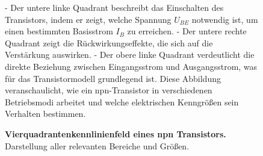{\begin{figure}[H]
{    - Der untere linke Quadrant beschreibt das Einschalten des Transistors, indem er zeigt, welche Spannung \( U_{BE} \) notwendig ist, um einen bestimmten Basisstrom \( I_B \) zu erreichen.  
    - Der untere rechte Quadrant zeigt die Rückwirkungseffekte, die sich auf die Verstärkung auswirken.  
    - Der obere linke Quadrant verdeutlicht die direkte Beziehung zwischen Eingangsstrom und Ausgangsstrom, was für das Transistormodell grundlegend ist.  
    Diese Abbildung veranschaulicht, wie ein npn-Transistor in verschiedenen Betriebsmodi arbeitet und welche elektrischen Kenngrößen sein Verhalten bestimmen.}
    \caption{\textbf{Vierquadrantenkennlinienfeld eines npn Transistors.} Darstellung aller relevanten Bereiche und Größen.}  
    \label{fig:Vierquadranten-KennlinienfeldEinesNpnTransistors}
\end{figure}
}



